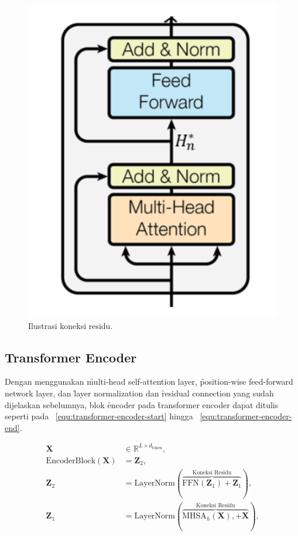 	\begin{figure}
		\centering
		\includegraphics[width=1\textwidth]{assets/pics/residual-connection-transformer.png}
		\caption{Ilustrasi koneksi residu.}
		\label{fig:residual-connection-transformers}
	\end{figure}

	\subsection{Transformer Encoder}
	\label{sec:encoder}

	Dengan menggunakan \f{multi-head self-attention layer}, \f{position-wise feed-forward network layer}, dan \f{layer normalization} dan \f{residual connection} yang sudah dijelaskan sebelumnya, blok \f{encoder} pada \f{transformer encoder} dapat ditulis seperti pada \equ~\ref{equ:transformer-encoder-start} hingga \equ~\ref{equ:transformer-encoder-end}.
			
	\begin{align}
	\mathbf{X} &\in \mathbb{R}^{L \times d_{\text{token}}}, \\
	\text{EncoderBlock}(\mathbf{X}) &= \mathbf{Z}_2, \\
	\mathbf{Z}_2 &= \text{LayerNorm}(\overbrace{\text{FFN}(\mathbf{Z}_1)+\mathbf{Z}_1}^{\text{Koneksi Residu}}), \\
	\mathbf{Z}_1 &= \text{LayerNorm}(\overbrace{\text{MHSA}_h(\mathbf{X}), + \mathbf{X}}^{\text{Koneksi Residu}}). \\
	\end{align}

